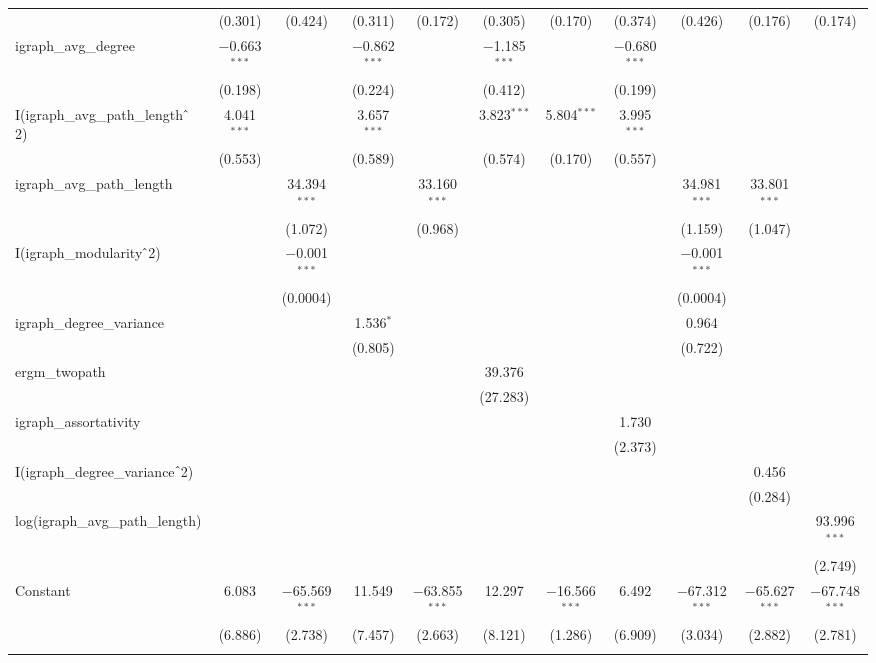 \begin{table}[!htbp]
\begin{tabular}{@{\extracolsep{5pt}}lcccccccccc}
  & (0.301) & (0.424) & (0.311) & (0.172) & (0.305) & (0.170) & (0.374) & (0.426) & (0.176) & (0.174) \\ 
  igraph\_avg\_degree & $-$0.663$^{***}$ &  & $-$0.862$^{***}$ &  & $-$1.185$^{***}$ &  & $-$0.680$^{***}$ &  &  &  \\ 
  & (0.198) &  & (0.224) &  & (0.412) &  & (0.199) &  &  &  \\ 
  I(igraph\_avg\_path\_length$\hat{\mkern6mu}$2) & 4.041$^{***}$ &  & 3.657$^{***}$ &  & 3.823$^{***}$ & 5.804$^{***}$ & 3.995$^{***}$ &  &  &  \\ 
  & (0.553) &  & (0.589) &  & (0.574) & (0.170) & (0.557) &  &  &  \\ 
  igraph\_avg\_path\_length &  & 34.394$^{***}$ &  & 33.160$^{***}$ &  &  &  & 34.981$^{***}$ & 33.801$^{***}$ &  \\ 
  &  & (1.072) &  & (0.968) &  &  &  & (1.159) & (1.047) &  \\ 
  I(igraph\_modularity$\hat{\mkern6mu}$2) &  & $-$0.001$^{***}$ &  &  &  &  &  & $-$0.001$^{***}$ &  &  \\ 
  &  & (0.0004) &  &  &  &  &  & (0.0004) &  &  \\ 
  igraph\_degree\_variance &  &  & 1.536$^{*}$ &  &  &  &  & 0.964 &  &  \\ 
  &  &  & (0.805) &  &  &  &  & (0.722) &  &  \\ 
  ergm\_twopath &  &  &  &  & 39.376 &  &  &  &  &  \\ 
  &  &  &  &  & (27.283) &  &  &  &  &  \\ 
  igraph\_assortativity &  &  &  &  &  &  & 1.730 &  &  &  \\ 
  &  &  &  &  &  &  & (2.373) &  &  &  \\ 
  I(igraph\_degree\_variance$\hat{\mkern6mu}$2) &  &  &  &  &  &  &  &  & 0.456 &  \\ 
  &  &  &  &  &  &  &  &  & (0.284) &  \\ 
  log(igraph\_avg\_path\_length) &  &  &  &  &  &  &  &  &  & 93.996$^{***}$ \\ 
  &  &  &  &  &  &  &  &  &  & (2.749) \\ 
  Constant & 6.083 & $-$65.569$^{***}$ & 11.549 & $-$63.855$^{***}$ & 12.297 & $-$16.566$^{***}$ & 6.492 & $-$67.312$^{***}$ & $-$65.627$^{***}$ & $-$67.748$^{***}$ \\ 
  & (6.886) & (2.738) & (7.457) & (2.663) & (8.121) & (1.286) & (6.909) & (3.034) & (2.882) & (2.781) \\ 
 \hline \\[-1.8ex] 

\end{tabular}
\end{table}
